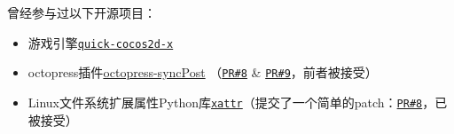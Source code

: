 \documentclass[letterpaper]{article}
\begin{document}
\begin{itemize}
\end{itemize}

曾经参与过以下开源项目：
\begin{itemize}
    \item 游戏引擎\href{https://github.com/dualface/v3quick}{\tt quick-cocos2d-x}
    \item octopress插件\href{https://github.com/huangbowen521/octopress-syncPost}{octopress-syncPost} （\href{https://github.com/huangbowen521/octopress-syncPost/pull/8}{\tt PR\#8} \& \href{https://github.com/huangbowen521/octopress-syncPost/pull/9}{\tt PR\#9}，前者被接受）
    \item Linux文件系统扩展属性Python库\href{https://github.com/xattr/xattr}{\tt xattr}（提交了一个简单的patch：\href{https://github.com/xattr/xattr/issues/8}{\tt PR\#8}，已被接受）
\end{itemize}

\end{document}
